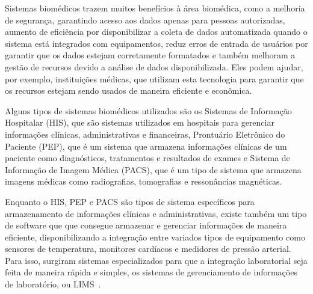 Sistemas biomédicos trazem muitos benefícios à área biomédica, como a melhoria de segurança, garantindo acesso aos dados apenas para pessoas autorizadas, aumento de eficiência por disponibilizar a coleta de dados automatizada quando o sistema está integrados com equipamentos, reduz erros de entrada de usuários por garantir que os dados estejam corretamente formatados e também melhoram a gestão de recursos devido a análise de dados disponibilizada. Eles podem ajudar, por exemplo, instituições médicas, que utilizam esta tecnologia para garantir que os recursos estejam sendo usados de maneira eficiente e econômica.

Alguns tipos de sistemas biomédicos utilizados são os Sistemas de Informação Hospitalar (HIS), que são sistemas utilizados em hospitais para gerenciar informações clínicas, administrativas e financeiras, Prontuário Eletrônico do Paciente (PEP), que é um sistema que armazena informações clínicas de um paciente como diagnósticos, tratamentos e resultados de exames e Sistema de Informação de Imagem Médica (PACS), que é um tipo de sistema que armazena imagens médicas como radiografias, tomografias e ressonâncias magnéticas.

Enquanto o HIS, PEP e PACS são tipos de sistema específicos para armazenamento de informações clínicas e administrativas, existe também um tipo de software que que consegue armazenar e gerenciar informações de maneira eficiente, disponibilizando a integração entre variados tipos de equipamento como sensores de temperatura, monitores cardíacos e medidores de pressão arterial. Para isso, surgiram sistemas especializados para que a integração laboratorial seja feita de maneira rápida e simples, os sistemas de gerenciamento de informações de laboratório, ou LIMS~\cite{Skobelev2011LaboratoryLaboratory}.






